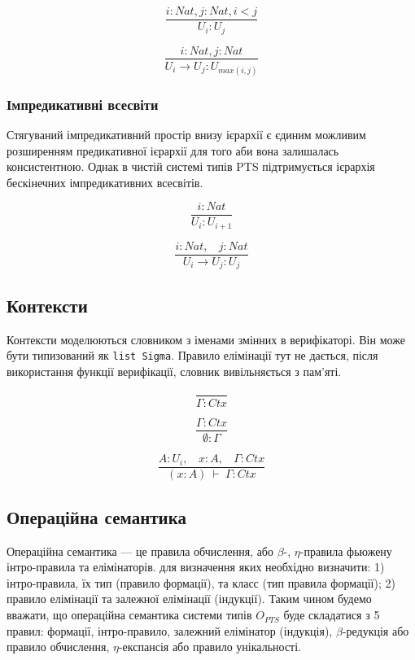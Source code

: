 \begin{equation}
\tag{$A_1$}
\dfrac{i: Nat, j: Nat, i < j}{U_i : U_j}
\end{equation}

\begin{equation}
\tag{$R_1$}
\dfrac{i : Nat, j : Nat}{U_i \rightarrow U_j : U_{max(i,j)} }
\end{equation}

\subsubsection*{Імпредикативні всесвіти}
Стягуваний імпредикативний простір внизу ієрархії є єдиним можливим розширенням
предикативної ієрархії для того аби вона залишалась консистентною. Однак
в чистій системі типів PTS підтримується ієрархія бескінечних імпредикативних всесвітів.

\begin{equation}
\tag{$A_2$}
\dfrac
{i: Nat}
{U_i : U_{i+1}}
\end{equation}

\begin{equation}
\tag{$R_2$}
\dfrac
{i : Nat,\ \ \ \ j : Nat}
{U_i \rightarrow U_{j} : U_{j}}
\end{equation}

\subsection*{Контексти}

Контексти моделюються словником з іменами змінних в верифікаторі.
Він може бути типизований як \lstinline{list Sigma}.
Правило елімінації тут не дається, після використання функції верифікації,
словник вивільняється з пам'яті.

\begin{equation}
\tag{Ctx-formation}
\dfrac
{}
{\Gamma : Ctx}
\end{equation}

\begin{equation}
\tag{Ctx-intro$_1$}
\dfrac
{\Gamma : Ctx}
{\emptyset : \Gamma}
\end{equation}

\begin{equation}
\tag{Ctx-intro$_2$}
\dfrac
{A : U_i,\ \ \ \ x : A,\ \ \ \ \Gamma : Ctx}
{(x : A)\ \vdash\ \Gamma : Ctx}
\end{equation}

\subsection{Операційна семантика}
Операційна семантика --- це правила обчислення, або $\beta$-, $\eta$-правила
фьюжену інтро-правила та елімінаторів. для визначення яких необхідно визначити:
1) інтро-правила, їх тип (правило формації), та класс (тип правила формації);
2) правило елімінації та залежної елімінації (індукції).
Таким чином будемо вважати, що операційна семантика системи типів $O_{PTS}$
буде складатися з 5 правил: формації, інтро-правило,
залежний елімінатор (індукція), $\beta$-редукція або правило обчислення,
$\eta$-експансія або правило унікальності.

